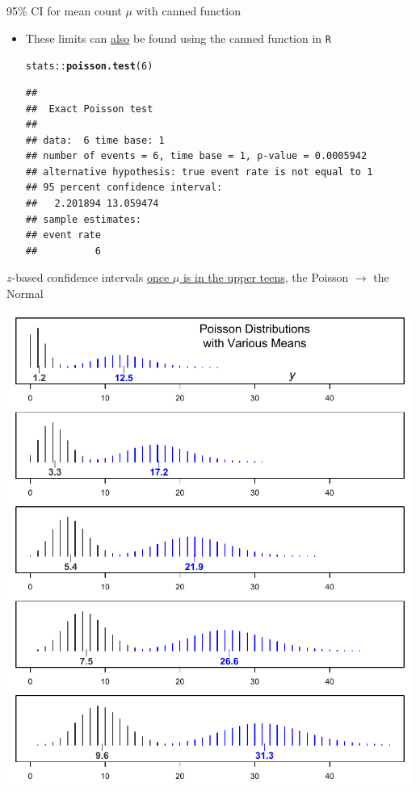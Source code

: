 \documentclass[handout]{beamer}\usepackage[]{graphicx}\usepackage[]{color}
\newcommand{\hlnum}[1]{\textcolor[rgb]{0.686,0.059,0.569}{#1}}%
\newcommand{\hlopt}[1]{\textcolor[rgb]{0,0,0}{#1}}%
\newcommand{\hlstd}[1]{\textcolor[rgb]{0.345,0.345,0.345}{#1}}%
\newcommand{\hlkwd}[1]{\textcolor[rgb]{0.737,0.353,0.396}{\textbf{#1}}}%
\newenvironment{knitrout}{}{} %
\begin{document}
\begin{frame}[fragile]{95\% CI for mean count $\mu$ with canned function}
\begin{itemize}
\setlength\itemsep{1em}
\item These limits can \underline{also} be found using  the canned function in \texttt{R} 

\begin{knitrout}\scriptsize
{}\color{fgcolor}
\begin{alltt}
\hlstd{stats}\hlopt{::}\hlkwd{poisson.test}\hlstd{(}\hlnum{6}\hlstd{)}
\end{alltt}
\begin{verbatim}
## 
## 	Exact Poisson test
## 
## data:  6 time base: 1
## number of events = 6, time base = 1, p-value = 0.0005942
## alternative hypothesis: true event rate is not equal to 1
## 95 percent confidence interval:
##   2.201894 13.059474
## sample estimates:
## event rate 
##          6
\end{verbatim}

\end{knitrout}

\end{itemize}
\end{frame}



\begin{frame}{$z$-based confidence intervals}
\scriptsize
\underline{once $\mu$ is in the upper teens}, the Poisson $\to$ the Normal

\centering
\includegraphics[scale=0.5]{Shapes.pdf}

\end{frame}
\end{document}
